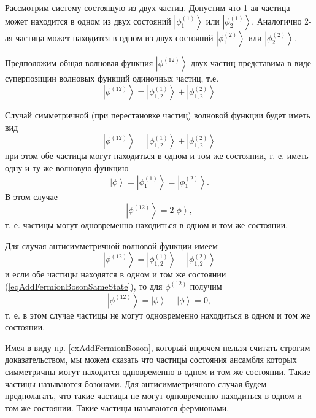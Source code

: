 \begin{example}
  Рассмотрим систему состоящую из двух частиц. Допустим что 1-ая частица
  может находится в одном из двух состояний $\left|\phi^{(1)}_1\right>$
  или $\left|\phi^{(1)}_2\right>$. Аналогично 2-ая частица может
  находится в одном из двух состояний $\left|\phi^{(2)}_1\right>$
  или $\left|\phi^{(2)}_2\right>$.

  Предположим общая волновая функция $\left|\phi^{(12)}\right>$ двух
  частиц представима в виде суперпозиции волновых функций одиночных
  частиц, т.е. 
  \begin{equation}
    \left|\phi^{(12)}\right> = \left|\phi^{(1)}_{1,2}\right> \pm
    \left|\phi^{(2)}_{1,2}\right>
    \nonumber
  \end{equation}

  Случай симметричной (при перестановке частиц) волновой функции будет
  иметь вид
  \begin{equation}
    \left|\phi^{(12)}\right> = \left|\phi^{(1)}_{1,2}\right> +
    \left|\phi^{(2)}_{1,2}\right>
    \nonumber
  \end{equation}
  при этом обе частицы могут находиться в одном и том же состоянии,
  т. е. иметь одну и ту же волновую функцию
  \begin{equation}
  \left|\phi\right> = \left|\phi^{(1)}_{1}\right> =
  \left|\phi^{(2)}_{1}\right>.
  \label{eqAddFermionBosonSameState}
  \end{equation}
  В этом случае
  \[
  \left|\phi^{(12)}\right> = 2 \left|\phi\right>, 
  \]
  т. е. частицы могут одновременно находиться в одном и том же
  состоянии.

  Для случая антисимметричной волновой функции имеем
  \begin{equation}
    \left|\phi^{(12)}\right> = \left|\phi^{(1)}_{1,2}\right> -
    \left|\phi^{(2)}_{1,2}\right>
    \nonumber
  \end{equation}
  и если обе частицы находятся в одном и том же состоянии
  (\ref{eqAddFermionBosonSameState}), то для $\phi^{(12)}$ получим
  \[
  \left|\phi^{(12)}\right> = \left|\phi\right> -\left|\phi\right> = 0,
  \]
  т. е. в этом случае частицы не могут одновременно находиться в одном
  и том же состоянии.
  \label{exAddFermionBoson}
\end{example}
Имея в виду пр. \ref{exAddFermionBoson}, который впрочем нельзя
считать строгим доказательством, мы можем сказать что частицы
состояния ансамбля которых симметричны могут находится одновременно в
одном и том же состоянии. Такие частицы называются бозонами. Для
антисимметричного случая будем 
предполагать, что такие частицы не могут одновременно находиться в
одном и том же состоянии. Такие частицы называются фермионами.

